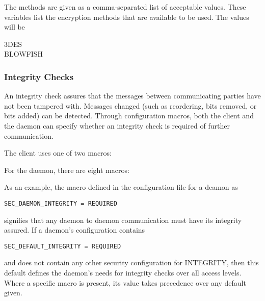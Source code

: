 The methods are
given as a comma-separated list of acceptable values.
These variables list the encryption methods that are available
to be used.
The values will be 
\begin{description}
    \item[3DES]
    \item[BLOWFISH]
\end{description}

\subsubsection{\label{sec:Security-Integrity} Integrity Checks}

An integrity check assures that the messages between communicating parties
have not been tampered with.
Messages changed (such as reordering, bits removed, or bits added)
can be detected.
Through configuration macros, both the client and the daemon
can specify whether an integrity check is required of further communication.

The client uses one of two macros:
\begin{description}
\item{}
\item{}
\end{description}

For the daemon, there are eight macros:
\begin{description}
\item{}
\item{}
\item{}
\item{}
\item{}
\item{}
\item{}
\item{}
\end{description}

As an example, the macro defined in the configuration file
for a deamon as
\begin{verbatim}
SEC_DAEMON_INTEGRITY = REQUIRED
\end{verbatim}
signifies that any daemon to daemon communication must
have its integrity assured.
If a daemon's configuration contains
\begin{verbatim}
SEC_DEFAULT_INTEGRITY = REQUIRED
\end{verbatim}
and does not contain any other security configuration for
INTEGRITY, then this default defines the daemon's needs
for integrity checks over all access levels.
Where a specific macro is present, its value takes
precedence over any default given.

